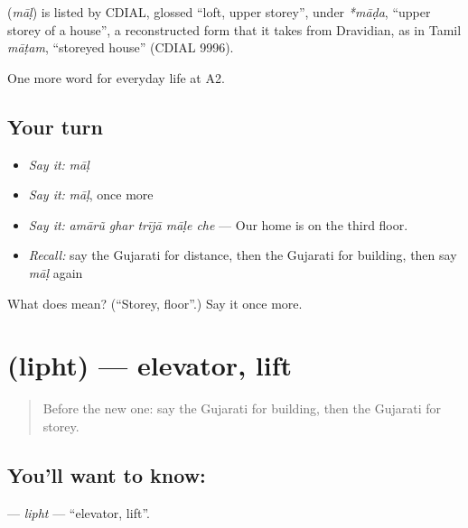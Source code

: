 \begin{cousinweb}
\textbf{} (\emph{māḷ}) is listed by CDIAL, glossed \textquotedblleft{}loft, upper storey\textquotedblright{}, under \emph{*māḍa}, \textquotedblleft{}upper storey of a house\textquotedblright{}, a reconstructed form that it takes from Dravidian, as in Tamil \emph{māṭam}, \textquotedblleft{}storeyed house\textquotedblright{} (CDIAL 9996).
\end{cousinweb}

\begin{grammarlens}[title={What you've built}]
One more word for everyday life at A2.
\end{grammarlens}

\subsection*{Your turn}
\begin{itemize}
\raggedright
  \item \emph{Say it:} \emph{māḷ}
  \item \emph{Say it:} \emph{māḷ}, once more
  \item \emph{Say it:} \emph{amārũ ghar trījā māḷe che} — Our home is on the third floor.
  \item \emph{Recall:} say the Gujarati for distance, then the Gujarati for building, then say \emph{māḷ} again
\end{itemize}

\begin{tcolorbox}[breakable,colback=teal!4,colframe=teal!35!black,title={Before you move on}]
What does  mean? (\textquotedblleft{}Storey, floor\textquotedblright{}.) Say it once more.
\end{tcolorbox}
\section[\texorpdfstring{\gu{લિફ્ટ} (lipht)}{લિફ્ટ (lipht)}]{ (lipht) — elevator, lift}

\label{lesson:GU-C196-lipht}



\begin{quote}
Before the new one: say the Gujarati for building, then the Gujarati for storey.
\end{quote}

\subsection*{You'll want to know: }
\textbf{} — \emph{lipht} — \textquotedblleft{}elevator, lift\textquotedblright{}.

